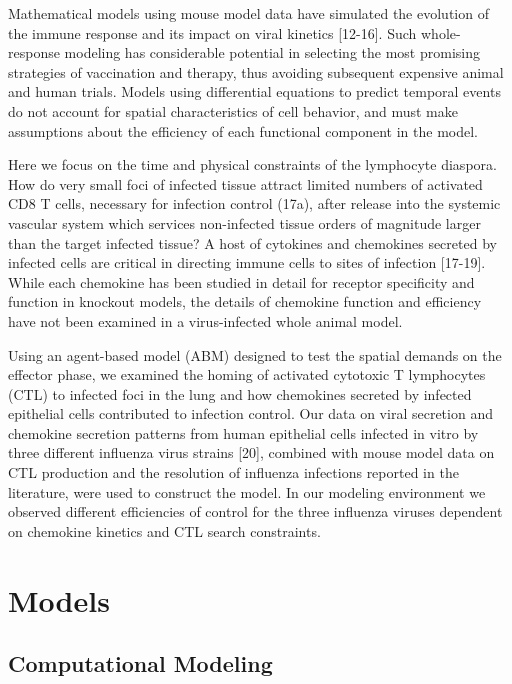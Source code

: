 \documentclass[10pt]{article}
\begin{document}
Mathematical models using mouse model data have simulated the evolution of the immune response and its impact on viral kinetics [12-16].  Such whole-response modeling has considerable potential in selecting the most promising strategies of vaccination and therapy, thus avoiding subsequent expensive animal and human trials.    Models using differential equations to predict temporal events do not account for spatial characteristics of cell behavior, and must make assumptions about the efficiency of each functional component in the model.   

Here we focus on the time and physical constraints of the lymphocyte diaspora.  How do very small foci of infected tissue attract limited numbers of activated CD8 T cells, necessary for infection control (17a), after release into the systemic vascular system which services non-infected tissue orders of magnitude larger than the target infected tissue?  A host of cytokines and chemokines secreted by infected cells are critical in directing immune cells to sites of infection [17-19].  While each chemokine has been studied in detail for receptor specificity and function in knockout models, the details of chemokine function and efficiency have not been examined in a virus-infected whole animal model.

Using an agent-based model (ABM) designed to test the spatial demands on the effector phase, we examined the homing of activated cytotoxic T lymphocytes (CTL) to infected foci in the lung and how chemokines secreted by infected epithelial cells contributed to infection control.   Our data on viral secretion and chemokine secretion patterns from human epithelial cells infected in vitro by three different influenza virus strains [20], combined with mouse model data on CTL production and the resolution of influenza infections reported in the literature, were used to construct the model. In our modeling environment we observed different efficiencies of control for the three influenza viruses dependent on chemokine kinetics and CTL search constraints.



\section*{Models}


\subsection*{Computational Modeling}
\end{document}
